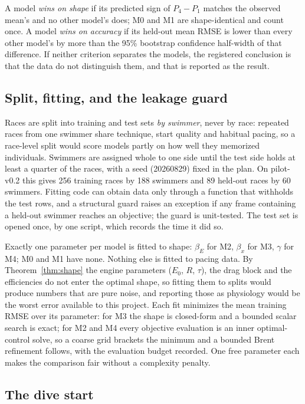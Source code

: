 A model \emph{wins on shape} if its predicted sign of $P_4-P_1$ matches the
observed mean's and no other model's does; M0 and M1 are shape-identical and
count once. A model \emph{wins on accuracy} if its held-out mean RMSE is
lower than every other model's by more than the 95\% bootstrap confidence
half-width of that difference. If neither criterion separates the models,
the registered conclusion is that the data do not distinguish them, and
that is reported as the result.

\subsection{Split, fitting, and the leakage guard}

Races are split into training and test sets \emph{by swimmer}, never by race:
repeated races from one swimmer share technique, start quality and habitual
pacing, so a race-level split would score models partly on how well they
memorized individuals. Swimmers are assigned whole to one side until the
test side holds at least a quarter of the races, with a seed (20260829)
fixed in the plan. On pilot-v0.2 this gives 256 training races by 188
swimmers and 89 held-out races by 60 swimmers. Fitting code can obtain data
only through a function that withholds the test rows, and a structural guard
raises an exception if any frame containing a held-out swimmer reaches an
objective; the guard is unit-tested. The test set is opened once, by one
script, which records the time it did so.

Exactly one parameter per model is fitted to shape: $\beta_E$ for M2,
$\beta_x$ for M3, $\gamma$ for M4; M0 and M1 have none. Nothing else is
fitted to pacing data. By Theorem~\ref{thm:shape} the engine parameters
($E_0$, $R$, $\tau$), the drag block and the efficiencies do not enter the
optimal shape, so fitting them to splits would produce numbers that are
pure noise, and reporting those as physiology would be the worst error
available to this project. Each fit minimizes the mean training RMSE over
its parameter: for M3 the shape is closed-form and a bounded scalar search
is exact; for M2 and M4 every objective evaluation is an inner
optimal-control solve, so a coarse grid brackets the minimum and a bounded
Brent refinement follows, with the evaluation budget recorded. One free
parameter each makes the comparison fair without a complexity penalty.

\subsection{The dive start}\label{sec:start}

